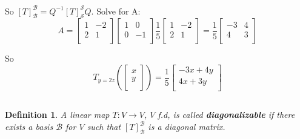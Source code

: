 \documentclass[a4paper,10pt]{article}
\newtheorem{definition}{Definition}[section]
\begin{document}
\begin{enumerate}
So $[T]_\mathcal{B}^\mathcal{B} = Q^{-1}[T]_\mathcal{S}^\mathcal{S}Q$. Solve for A:
$$A=
\begin{bmatrix}
	1 & -2 \\
	2 & 1 \\
\end{bmatrix}
\begin{bmatrix}
	1 & 0 \\
	0 & -1 \\
\end{bmatrix}
\frac{1}{5}
\begin{bmatrix}
	1 & -2 \\
	2 & 1 \\
\end{bmatrix}
=
\frac{1}{5}
\begin{bmatrix}
	-3 & 4 \\
	4 & 3 \\
\end{bmatrix}
$$

So 
$$
T_{y=2z}\left(
\begin{bmatrix}
	x \\
	y \\
\end{bmatrix}
\right)
=
\frac{1}{5}
\begin{bmatrix}
	-3x+4y \\
	 4x+3y  \\
\end{bmatrix}
$$

\begin{center}
	
\end{center}

\end{enumerate}		

\subsection{}
\begin{definition}
A linear map $T: V \to V$, $V$ f.d, is called \textbf{diagonalizable} if there 
exists a basis $\mathcal{B}$ for $V$ such that $[T]_\mathcal{B}^\mathcal{B}$ is a diagonal matrix.
\end{definition}
\end{document}
